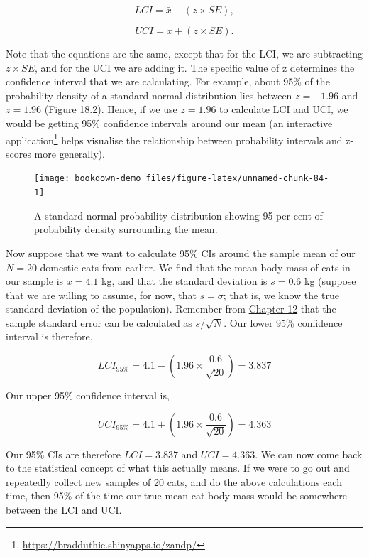 \documentclass[
]{scrbook}
\begin{document}
\[LCI = \bar{x} - (z \times SE),\]

\[UCI = \bar{x} + (z \times SE).\]

Note that the equations are the same, except that for the LCI, we are subtracting \(z \times SE\), and for the UCI we are adding it.
The specific value of z determines the confidence interval that we are calculating.
For example, about 95\% of the probability density of a standard normal distribution lies between \(z = -1.96\) and \(z = 1.96\) (Figure 18.2).
Hence, if we use \(z = 1.96\) to calculate LCI and UCI, we would be getting 95\% confidence intervals around our mean (an interactive application\footnote{\url{https://bradduthie.shinyapps.io/zandp/}} helps visualise the relationship between probability intervals and z-scores more generally).

\begin{figure}
\texttt{[image: bookdown-demo\_files/figure-latex/unnamed-chunk-84-1]} \caption{A standard normal probability distribution showing 95 per cent of probability density surrounding the mean.}\label{fig:unnamed-chunk-84}
\end{figure}

Now suppose that we want to calculate 95\% CIs around the sample mean of our \(N = 20\) domestic cats from earlier.
We find that the mean body mass of cats in our sample is \(\bar{x} = 4.1\) kg, and that the standard deviation is \(s = 0.6\) kg (suppose that we are willing to assume, for now, that \(s = \sigma\); that is, we know the true standard deviation of the population).
Remember from \protect\hyperlink{Chapter_12}{Chapter 12} that the sample standard error can be calculated as \(s / \sqrt{N}\).
Our lower 95\% confidence interval is therefore,

\[LCI_{95\%} = 4.1 - \left(1.96 \times \frac{0.6}{\sqrt{20}}\right) = 3.837\]

Our upper 95\% confidence interval is,

\[UCI_{95\%} = 4.1 + \left(1.96 \times \frac{0.6}{\sqrt{20}}\right) = 4.363\]

Our 95\% CIs are therefore \(LCI = 3.837\) and \(UCI = 4.363\).
We can now come back to the statistical concept of what this actually means.
If we were to go out and repeatedly collect new samples of 20 cats, and do the above calculations each time, then 95\% of the time our true mean cat body mass would be somewhere between the LCI and UCI.
\end{document}
